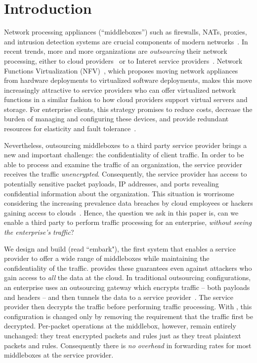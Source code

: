 

\section{Introduction}\label{sec:intro}


    Network processing appliances (``middleboxes'') such as firewalls, NATs, proxies, and intrusion detection systems are crucial components of modern networks~\cite{aplomb,darksideofthemiddle,morley-paper}. 
     In recent trends, more and more organizations are {\it outsourcing} their network processing, either to cloud providers~\cite{aplomb, aryaka, zscalar} or to Interet service providers~\cite{attddos,comcastparentalfiltering}. 
     Network Functions Virtualization (NFV)~\cite{nfv}, which proposes moving network appliances from hardware deployments to virtualized software deployments, makes this move increasingly attractive to service providers who can offer virtualized network functions in a similar fashion to how cloud providers support virtual servers and storage.
     For enterprise clients, this strategy promises to reduce costs, decrease the burden of managing and configuring these devices, and provide redundant resources for elasticity and fault tolerance~\cite{aplomb}.
   
   Nevertheless, outsourcing middleboxes to a third party service provider brings a new and important challenge: the confidentiality of client traffic. In order to be able to process and examine the traffic of an organization, the service provider  receives  the traffic {\em unencrypted}.  Consequently, the service provider has access to potentially sensitive packet payloads,  IP addresses, and ports revealing confidential information about the organization. This situation is worrisome considering the increasing prevalence data breaches by cloud employees or hackers gaining access to clouds~\cite{PrivacyRecords, more, more, makeitsoundsuperscary}.
   Hence, the question we ask in this paper is, can we enable a third party to perform traffic processing for an enterprise, {\em without seeing the enterprise's traffic}?
   
   
    We design and build \sys (read ``embark"), the first system that enables a service provider to offer a wide range of middleboxes  while maintaining the confidentiality of the traffic. \sys provides these guarantees even against attackers who gain access to {\em all} the data at the cloud.  
  In traditional outsourcing configurations, an enterprise uses an outsourcing gateway which encrypts traffic -- both payloads and headers -- and then tunnels the data to a service provider~\cite{aplomb}.
  The service provider then decrypts the traffic before performing traffic processing.
  With \sys, this configuration is changed only by removing the requirement that the traffic first be decrypted.
    Per-packet operations at the middlebox, however, remain entirely unchanged: they treat encrypted packets and rules just as they treat plaintext packets and rules.
   Consequently there is {\it no overhead} in forwarding rates for most middleboxes at the service provider.

